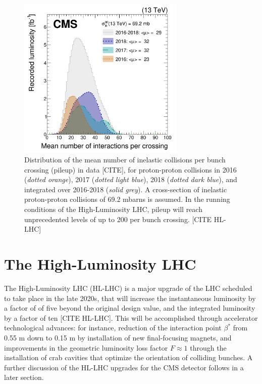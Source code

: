 \begin{figure}[ht]
    \centering
    \includegraphics[width=8cm]{figures/ch-2-cern-cms/pileup-run-2-CMS-JME-18-001_Figure_001.png}
    \caption{Distribution of the mean number of inelastic collisions per bunch crossing (pileup) in data [CITE], for proton-proton collisions in 2016 (\textit{dotted orange}), 2017 (\textit{dotted light blue}), 2018 (\textit{dotted dark blue}), and integrated over 2016-2018 (\textit{solid grey}). A cross-section of inelastic proton-proton collisions of 69.2 mbarns is assumed. In the running conditions of the High-Luminosity LHC, pileup will reach unprecedented levels of up to 200 per bunch crossing. [CITE HL-LHC]}
    \label{fig:pileup-run-2}
\end{figure}

\section{The High-Luminosity LHC}
The High-Luminosity LHC (HL-LHC) is a major upgrade of the LHC scheduled to take place in the late 2020s, that will increase the instantaneous luminosity by a factor of of five beyond the original design value, and the integrated luminosity by a factor of ten [CITE HL-LHC]. This will be accomplished through accelerator technological advances: for instance, reduction of the interaction point $\beta^*$ from 0.55 m down to 0.15 m by installation of new final-focusing magnets, and improvements in the geometric luminosity loss factor $F \approx 1$ through the installation of crab cavities that optimize the orientation of colliding bunches. A further discussion of the HL-LHC upgrades for the CMS detector follows in a later section.

